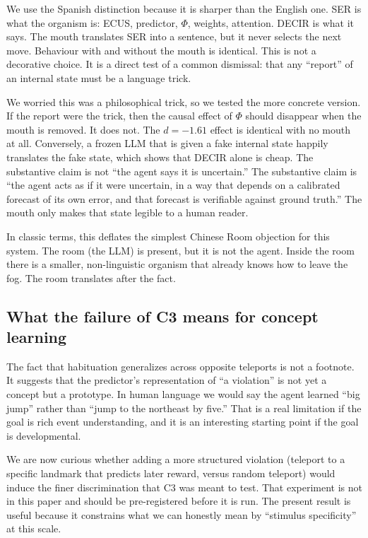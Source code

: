 \documentclass[11pt,a4paper]{article}
\begin{document}
We use the Spanish distinction because it is sharper than the English one. SER is what the organism is: ECUS, predictor, $\Phi$, weights, attention. DECIR is what it says. The mouth translates SER into a sentence, but it never selects the next move. Behaviour with and without the mouth is identical. This is not a decorative choice. It is a direct test of a common dismissal: that any ``report'' of an internal state must be a language trick.

We worried this was a philosophical trick, so we tested the more concrete version. If the report were the trick, then the causal effect of $\Phi$ should disappear when the mouth is removed. It does not. The $d=-1.61$ effect is identical with no mouth at all. Conversely, a frozen LLM that is given a fake internal state happily translates the fake state, which shows that DECIR alone is cheap. The substantive claim is not ``the agent says it is uncertain.'' The substantive claim is ``the agent acts as if it were uncertain, in a way that depends on a calibrated forecast of its own error, and that forecast is verifiable against ground truth.'' The mouth only makes that state legible to a human reader.

In classic terms, this deflates the simplest Chinese Room objection for this system. The room (the LLM) is present, but it is not the agent. Inside the room there is a smaller, non-linguistic organism that already knows how to leave the fog. The room translates after the fact.

\subsection{What the failure of C3 means for concept learning}

The fact that habituation generalizes across opposite teleports is not a footnote. It suggests that the predictor's representation of ``a violation'' is not yet a concept but a prototype. In human language we would say the agent learned ``big jump'' rather than ``jump to the northeast by five.'' That is a real limitation if the goal is rich event understanding, and it is an interesting starting point if the goal is developmental.

We are now curious whether adding a more structured violation (teleport to a specific landmark that predicts later reward, versus random teleport) would induce the finer discrimination that C3 was meant to test. That experiment is not in this paper and should be pre-registered before it is run. The present result is useful because it constrains what we can honestly mean by ``stimulus specificity'' at this scale.
\end{document}
